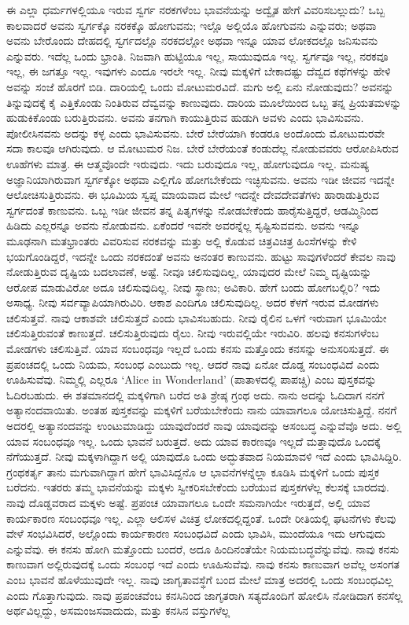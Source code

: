 ಈ ಎಲ್ಲಾ ಧರ್ಮಗಳಲ್ಲಿಯೂ ಇರುವ ಸ್ವರ್ಗ ನರಕಗಳೆಂಬ ಭಾವನೆಯನ್ನು ಅದ್ವೈತ ಹೇಗೆ ವಿವರಿಸಬಲ್ಲುದು? ಒಬ್ಬ ಕಾಲವಾದರೆ ಅವನು ಸ್ವರ್ಗಕ್ಕೊ ನರಕಕ್ಕೊ ಹೋಗುವನು; ಇಲ್ಲೊ ಅಲ್ಲಿಯೊ ಹೋಗುವನು ಎನ್ನುವರು; ಅಥವಾ ಅವನು ಬೇರೊಂದು ದೇಹದಲ್ಲಿ ಸ್ವರ್ಗದಲ್ಲೊ ನರಕದಲ್ಲೋ ಅಥವಾ ಇನ್ನೂ ಯಾವ ಲೋಕದಲ್ಲೊ ಜನಿಸುವನು ಎನ್ನುವರು. ಇದೆಲ್ಲ ಒಂದು ಭ್ರಾಂತಿ. ನಿಜವಾಗಿ ಹುಟ್ಟಿಯೂ ಇಲ್ಲ, ಸಾಯುವುದೂ ಇಲ್ಲ. ಸ್ವರ್ಗವೂ ಇಲ್ಲ, ನರಕವೂ ಇಲ್ಲ, ಈ ಜಗತ್ತೂ ಇಲ್ಲ. ಇವುಗಳು ಎಂದೂ ಇರಲೇ ಇಲ್ಲ. ನೀವು ಮಕ್ಕಳಿಗೆ ಬೇಕಾದಷ್ಟು ದೆವ್ವದ ಕಥೆಗಳನ್ನು ಹೇಳಿ ಅವನ್ನು ಸಂಜೆ ಹೊರಗೆ ಬಿಡಿ. ದಾರಿಯಲ್ಲಿ ಒಂದು ಮೋಟುಮರವಿದೆ. ಮಗು ಅಲ್ಲಿ ಏನು ನೋಡುವುದು? ಅವನನ್ನು ತಿನ್ನುವುದಕ್ಕೆ ಕೈ ಎತ್ತಿಕೊಂಡು ನಿಂತಿರುವ ದೆವ್ವವನ್ನು ಕಾಣುವುದು. ದಾರಿಯ ಮೂಲೆಯಿಂದ ಒಬ್ಬ ತನ್ನ ಪ್ರಿಯತಮಳನ್ನು ಹುಡುಕಿಕೊಂಡು ಬರುತ್ತಿರುವನು. ಅವನು ತನಗಾಗಿ ಕಾಯುತ್ತಿರುವ ಹುಡುಗಿ ಅವಳು ಎಂದು ಭಾವಿಸುವನು. ಪೋಲೀಸಿನವನು ಅದನ್ನು ಕಳ್ಳ ಎಂದು ಭಾವಿಸುವನು. ಬೇರೆ ಬೇರೆಯಾಗಿ ಕಂಡರೂ ಅಂದೊಂದು ಮೋಟುಮರವೇ ಸದಾ ಕಾಲವೂ ಆಗಿರುವುದು. ಆ ಮೋಟುಮರ ನಿಜ. ಬೇರೆ ಬೇರೆಯಂತೆ ಕಂಡುದೆಲ್ಲ ನೋಡುವವರು ಆರೋಪಿಸಿರುವ ಊಹೆಗಳು ಮಾತ್ರ. ಈ ಆತ್ಮವೊಂದೇ ಇರುವುದು. ಇದು ಬರುವುದೂ ಇಲ್ಲ, ಹೋಗುವುದೂ ಇಲ್ಲ. ಮನುಷ್ಯ ಅಜ್ಞಾನಿಯಾಗಿರುವಾಗ ಸ್ವರ್ಗಕ್ಕೋ ಅಥವಾ ಎಲ್ಲಿಗೊ ಹೋಗಬೇಕೆಂದು ಇಚ್ಛಿಸುವನು. ಅವನು ಇಡೀ ಜೀವನ ಇದನ್ನೇ ಆಲೋಚಿಸುತ್ತಿರುವನು. ಈ ಭೂಮಿಯ ಸ್ವಪ್ನ ಮಾಯವಾದ ಮೇಲೆ ಇದನ್ನೇ ದೇವದೇವತೆಗಳು ಹಾರಾಡುತ್ತಿರುವ ಸ್ವರ್ಗದಂತೆ ಕಾಣುವನು. ಒಬ್ಬ ಇಡೀ ಜೀವನ ತನ್ನ ಪಿತೃಗಳನ್ನು ನೋಡಬೇಕೆಂದು ಹಾರೈಸುತ್ತಿದ್ದರೆ, ಆಡಮ್ಮಿನಿಂದ ಹಿಡಿದು ಎಲ್ಲರನ್ನೂ ಅವನು ನೋಡುವನು. ಏಕೆಂದರೆ ಇವನೇ ಅವರನ್ನೆಲ್ಲ ಸೃಷ್ಟಿಸುವವನು. ಅವನು ಇನ್ನೂ ಮೂಢನಾಗಿ ಮತಭ್ರಾಂತರು ವಿವರಿಸುವ ನರಕವನ್ನು ಮತ್ತು ಅಲ್ಲಿ ಕೊಡುವ ಚಿತ್ರವಿಚಿತ್ರ ಹಿಂಸೆಗಳನ್ನು ಕೇಳಿ ಭಯಗೊಂಡಿದ್ದರೆ, ಇದನ್ನೇ ಒಂದು ನರಕದಂತೆ ಅವನು ಅನಂತರ ಕಾಣುವನು. ಹುಟ್ಟು ಸಾವುಗಳೆಂದರೆ ಕೇವಲ ನಾವು ನೋಡುತ್ತಿರುವ ದೃಷ್ಟಿಯ ಬದಲಾವಣೆ, ಅಷ್ಟೆ. ನೀವೂ ಚಲಿಸುವುದಿಲ್ಲ, ಯಾವುದರ ಮೇಲೆ ನಿಮ್ಮ ದೃಷ್ಟಿಯನ್ನು ಆರೋಪ ಮಾಡುವಿರೋ ಅದೂ ಚಲಿಸುವುದಿಲ್ಲ. ನೀವು ಸ್ಥಾಣು; ಅವಿಕಾರಿ. ಹೇಗೆ ಬಂದು ಹೋಗಬಲ್ಲಿರಿ? ಇದು ಅಸಾಧ್ಯ. ನೀವು ಸರ್ವವ್ಯಾಪಿಯಾಗಿರುವಿರಿ. ಆಕಾಶ ಎಂದಿಗೂ ಚಲಿಸುವುದಿಲ್ಲ. ಅದರ ಕೆಳಗೆ ಇರುವ ಮೋಡಗಳು ಚಲಿಸುತ್ತವೆ. ನಾವು ಆಕಾಶವೇ ಚಲಿಸುತ್ತದೆ ಎಂದು ಭಾವಿಸಬಹುದು. ನೀವು ರೈಲಿನ ಒಳಗೆ ಇರುವಾಗ ಭೂಮಿಯೇ ಚಲಿಸುತ್ತಿರುವಂತೆ ಕಾಣುತ್ತದೆ. ಚಲಿಸುತ್ತಿರುವುದು ರೈಲು. ನೀವು ಇರುವಲ್ಲಿಯೇ ಇರುವಿರಿ. ಹಲವು ಕನಸುಗಳೆಂಬ ಮೋಡಗಳು ಚಲಿಸುತ್ತಿವೆ. ಯಾವ ಸಂಬಂಧವೂ ಇಲ್ಲದೆ ಒಂದು ಕನಸು ಮತ್ತೊಂದು ಕನಸನ್ನು ಅನುಸರಿಸುತ್ತದೆ. ಈ ಪ್ರಪಂಚದಲ್ಲಿ ಒಂದು ನಿಯಮ, ಸಂಬಂಧ ಎಂಬುದು ಇಲ್ಲ. ಆದರೆ ನಾವು ಏನೋ ದೊಡ್ಡ ಸಂಬಂಧವಿದೆ ಎಂದು ಊಹಿಸುವೆವು. ನಿಮ್ಮಲ್ಲಿ ಎಲ್ಲರೂ `Alice in Wonderland' (ಪಾತಾಳದಲ್ಲಿ ಪಾಪಚ್ಚಿ) ಎಂಬ ಪುಸ್ತಕವನ್ನು ಓದಿರಬಹುದು. ಈ ಶತಮಾನದಲ್ಲಿ ಮಕ್ಕಳಿಗಾಗಿ ಬರೆದ ಅತಿ ಶ್ರೇಷ್ಠ ಗ್ರಂಥ ಅದು. ನಾನು ಅದನ್ನು ಓದಿದಾಗ ನನಗೆ ಅತ್ಯಾನಂದವಾಯಿತು. ಅಂತಹ ಪುಸ್ತಕವನ್ನು ಮಕ್ಕಳಿಗೆ ಬರೆಯಬೇಕೆಂದು ನಾನು ಯಾವಾಗಲೂ ಯೋಚಿಸುತ್ತಿದ್ದೆ. ನನಗೆ ಅದರಲ್ಲಿ ಅತ್ಯಾನಂದವನ್ನು ಉಂಟುಮಾಡಿದ್ದು ಯಾವುದೆಂದರೆ ನಾವು ಯಾವುದನ್ನು ಅಸಂಬದ್ಧ ಎನ್ನುವೆವೊ ಅದು. ಅಲ್ಲಿ ಯಾವ ಸಂಬಂಧವೂ ಇಲ್ಲ. ಒಂದು ಭಾವನೆ ಬರುತ್ತದೆ. ಅದು ಯಾವ ಕಾರಣವೂ ಇಲ್ಲದೆ ಮತ್ತಾವುದೊ ಒಂದಕ್ಕೆ ನೆಗೆಯುತ್ತದೆ. ನೀವು ಮಕ್ಕಳಾಗಿದ್ದಾಗ ಅಲ್ಲಿ ಯಾವುದೊ ಒಂದು ಅದ್ಭುತವಾದ ನಿಯಮಾವಳಿ ಇದೆ ಎಂದು ಭಾವಿಸಿದ್ದಿರಿ. ಗ್ರಂಥಕರ್ತೃ ತಾನು ಮಗುವಾಗಿದ್ದಾಗ ಹೇಗೆ ಭಾವಿಸಿದ್ದನೊ ಆ ಭಾವನೆಗಳನ್ನೆಲ್ಲಾ ಕೂಡಿಸಿ ಮಕ್ಕಳಿಗೆ ಒಂದು ಪುಸ್ತಕ ಬರೆದನು. ಇತರರು ತಮ್ಮ ಭಾವನೆಯನ್ನು ಮಕ್ಕಳು ಸ್ವೀಕರಿಸಬೇಕೆಂದು ಬರೆಯುವ ಪುಸ್ತಕಗಳೆಲ್ಲ ಕೆಲಸಕ್ಕೆ ಬಾರದವು. ನಾವು ದೊಡ್ಡವರಾದ ಮಕ್ಕಳು ಅಷ್ಟೆ. ಪ್ರಪಂಚ ಯಾವಾಗಲೂ ಒಂದೇ ಸಮನಾಗಿಯೇ ಇರುತ್ತದೆ, ಅಲ್ಲಿ ಯಾವ ಕಾರ್ಯಕಾರಣ ಸಂಬಂಧವೂ ಇಲ್ಲ. ಎಲ್ಲಾ ಆಲಿಸಳ ವಿಚಿತ್ರ ಲೋಕದಲ್ಲಿದ್ದಂತೆ. ಒಂದೇ ರೀತಿಯಲ್ಲಿ ಘಟನೆಗಳು ಕೆಲವು ವೇಳೆ ಸಂಭವಿಸಿದರೆ, ಅಲ್ಲೊಂದು ಕಾರ್ಯಕಾರಣ ಸಂಬಂಧವಿದೆ ಎಂದು ಭಾವಿಸಿ, ಮುಂದೆಯೂ ಇದು ಆಗುವುದು ಎನ್ನುವೆವು. ಈ ಕನಸು ಹೋಗಿ ಮತ್ತೊಂದು ಬಂದರೆ, ಅದೂ ಹಿಂದಿನಂತೆಯೇ ನಿಯಮಬದ್ಧವೆನ್ನುವೆವು. ನಾವು ಕನಸು ಕಾಣುವಾಗ ಅಲ್ಲಿರುವುದಕ್ಕೆ ಒಂದು ಸಂಬಂಧ ಇದೆ ಎಂದು ಊಹಿಸುವೆವು. ನಾವು ಕನಸು ಕಾಣುವಾಗ ಅವೆಲ್ಲ ಅಸಂಗತ ಎಂಬ ಭಾವನೆ ಹೊಳೆಯುವುದೇ ಇಲ್ಲ. ನಾವು ಜಾಗೃತಾವಸ್ಥೆಗೆ ಬಂದ ಮೇಲೆ ಮಾತ್ರ ಅದರಲ್ಲಿ ಒಂದು ಸಂಬಂಧವಿಲ್ಲ ಎಂದು ಗೊತ್ತಾಗುವುದು. ನಾವು ಪ್ರಪಂಚವೆಂಬ ಕನಸಿನಿಂದ ಜಾಗೃತರಾಗಿ ಸತ್ಯದೊಂದಿಗೆ ಹೋಲಿಸಿ ನೋಡಿದಾಗ ಕನಸೆಲ್ಲ ಅರ್ಥವಿಲ್ಲದ್ದು, ಅಸಮಂಜಸವಾದುದು, ಮತ್ತು ಕನಸಿನ ವಸ್ತುಗಳೆಲ್ಲ 